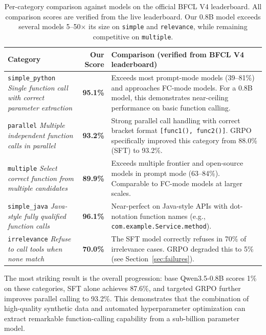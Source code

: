 \documentclass[10pt,twocolumn]{article}
\begin{document}
\begin{table}[!htbp]
\centering
\caption{Per-category comparison against models on the official BFCL V4 leaderboard. All comparison scores are verified from the live leaderboard. Our 0.8B model exceeds several models 5--50$\times$ its size on \texttt{simple} and \texttt{relevance}, while remaining competitive on \texttt{multiple}.}
\label{tab:percategory}
\small
\begin{tabularx}{\textwidth}{p{2.5cm}|r|X}
\toprule
\textbf{Category} & \textbf{Our Score} & \textbf{Comparison (verified from BFCL V4 leaderboard)} \\
\midrule
\texttt{simple\_python} \newline \textit{Single function call with correct parameter extraction}
& \textbf{95.1\%}
& Exceeds most prompt-mode models (39--81\%) and approaches FC-mode models. For a 0.8B model, this demonstrates near-ceiling performance on basic function calling. \\
\midrule
\texttt{parallel} \newline \textit{Multiple independent function calls in parallel}
& \textbf{93.2\%}
& Strong parallel call handling with correct bracket format \texttt{[func1(), func2()]}. GRPO specifically improved this category from 88.0\% (SFT) to 93.2\%. \\
\midrule
\texttt{multiple} \newline \textit{Select correct function from multiple candidates}
& \textbf{89.9\%}
& Exceeds multiple frontier and open-source models in prompt mode (63--84\%). Comparable to FC-mode models at larger scales. \\
\midrule
\texttt{simple\_java} \newline \textit{Java-style fully qualified function calls}
& \textbf{96.1\%}
& Near-perfect on Java-style APIs with dot-notation function names (e.g., \texttt{com.example.Service.method}). \\
\midrule
\texttt{irrelevance} \newline \textit{Refuse to call tools when none match}
& \textbf{70.0\%}
& The SFT model correctly refuses in 70\% of irrelevance cases. GRPO degraded this to 5\% (see Section~\ref{sec:failures}). \\
\bottomrule
\end{tabularx}
\end{table}

The most striking result is the overall progression: base Qwen3.5-0.8B scores 1\% on these categories, SFT alone achieves 87.6\%, and targeted GRPO further improves parallel calling to 93.2\%. This demonstrates that the combination of high-quality synthetic data and automated hyperparameter optimization can extract remarkable function-calling capability from a sub-billion parameter model.
\end{document}
